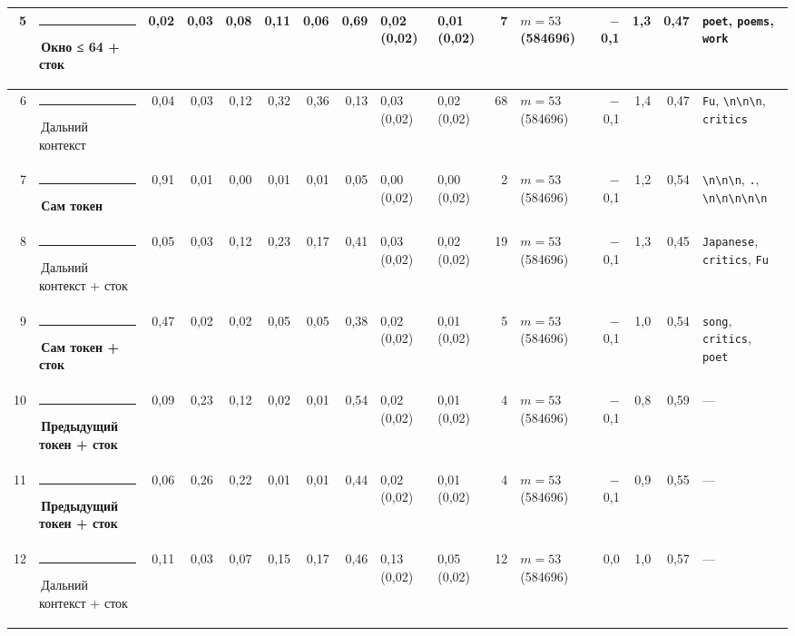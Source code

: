 \documentclass[10pt]{article}
\begin{document}
\begin{minipage}{\linewidth}
\begin{center}
{\begin{tabular}{|r|l|r|r|r|r|r|r|l|l|r|l|r|r|r|l|}
5 & \textcolor[HTML]{EDA100}{\rule{0.62em}{0.62em}}\,\textbf{Окно ≤ 64 + сток} & 0,02 & 0,03 & 0,08 & 0,11 & 0,06 & 0,69 & 0,02 (0,02) & 0,01 (0,02) & 7 & $m{=}53$ (584696) & $-$0,1 & 1,3 & 0,47 & \texttt{\textvisiblespace{}poet}, \texttt{\textvisiblespace{}poems}, \texttt{\textvisiblespace{}work} \\ \hline
6 & \textcolor[HTML]{C3C2B7}{\rule{0.62em}{0.62em}}\,Дальний контекст & 0,04 & 0,03 & 0,12 & 0,32 & 0,36 & 0,13 & 0,03 (0,02) & 0,02 (0,02) & 68 & $m{=}53$ (584696) & $-$0,1 & 1,4 & 0,47 & \texttt{\textvisiblespace{}Fu}, \texttt{\textvisiblespace{}\textbackslash{}n\textbackslash{}n\textbackslash{}n}, \texttt{\textvisiblespace{}critics} \\ \hline
7 & \textcolor[HTML]{2A78D6}{\rule{0.62em}{0.62em}}\,\textbf{Сам токен} & 0,91 & 0,01 & 0,00 & 0,01 & 0,01 & 0,05 & 0,00 (0,02) & 0,00 (0,02) & 2 & $m{=}53$ (584696) & $-$0,1 & 1,2 & 0,54 & \texttt{\textvisiblespace{}\textbackslash{}n\textbackslash{}n\textbackslash{}n}, \texttt{\textvisiblespace{}.}, \texttt{\textvisiblespace{}\textbackslash{}n\textbackslash{}n\textbackslash{}n\textbackslash{}n\textbackslash{}n} \\ \hline
8 & \textcolor[HTML]{C3C2B7}{\rule{0.62em}{0.62em}}\,Дальний контекст + сток & 0,05 & 0,03 & 0,12 & 0,23 & 0,17 & 0,41 & 0,03 (0,02) & 0,02 (0,02) & 19 & $m{=}53$ (584696) & $-$0,1 & 1,3 & 0,45 & \texttt{\textvisiblespace{}Japanese}, \texttt{\textvisiblespace{}critics}, \texttt{\textvisiblespace{}Fu} \\ \hline
9 & \textcolor[HTML]{2A78D6}{\rule{0.62em}{0.62em}}\,\textbf{Сам токен + сток} & 0,47 & 0,02 & 0,02 & 0,05 & 0,05 & 0,38 & 0,02 (0,02) & 0,01 (0,02) & 5 & $m{=}53$ (584696) & $-$0,1 & 1,0 & 0,54 & \texttt{\textvisiblespace{}song}, \texttt{\textvisiblespace{}critics}, \texttt{\textvisiblespace{}poet} \\ \hline
10 & \textcolor[HTML]{2A78D6}{\rule{0.62em}{0.62em}}\,\textbf{Предыдущий токен + сток} & 0,09 & 0,23 & 0,12 & 0,02 & 0,01 & 0,54 & 0,02 (0,02) & 0,01 (0,02) & 4 & $m{=}53$ (584696) & $-$0,1 & 0,8 & 0,59 & — \\ \hline
11 & \textcolor[HTML]{2A78D6}{\rule{0.62em}{0.62em}}\,\textbf{Предыдущий токен + сток} & 0,06 & 0,26 & 0,22 & 0,01 & 0,01 & 0,44 & 0,02 (0,02) & 0,01 (0,02) & 4 & $m{=}53$ (584696) & $-$0,1 & 0,9 & 0,55 & — \\ \hline
12 & \textcolor[HTML]{C3C2B7}{\rule{0.62em}{0.62em}}\,Дальний контекст + сток & 0,11 & 0,03 & 0,07 & 0,15 & 0,17 & 0,46 & 0,13 (0,02) & 0,05 (0,02) & 12 & $m{=}53$ (584696) & 0,0 & 1,0 & 0,57 & — \\ \hline

\end{tabular}}
\end{center}
\end{minipage}
\end{document}
